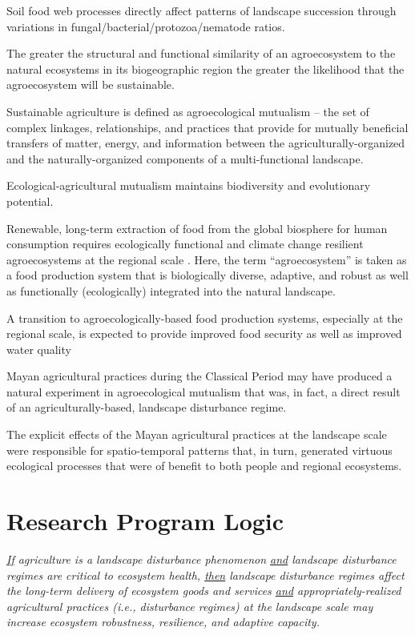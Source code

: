 \begin{outline}[enumerate]
  \1 Soil food web processes directly affect patterns of landscape succession through variations in fungal/bacterial/protozoa/nematode ratios.
  
  \1 The greater the structural and functional similarity of an agroecosystem to the natural ecosystems in its biogeographic region the greater the likelihood that the agroecosystem will be sustainable. 
  
  \1 Sustainable agriculture is defined as agroecological mutualism -- the set of complex linkages, relationships, and practices that provide for mutually beneficial transfers of matter, energy, and information between the agriculturally-organized and the naturally-organized components of a multi-functional landscape. 
  
  \1 Ecological-agricultural mutualism maintains biodiversity and evolutionary potential.
  
  \1 Renewable, long-term extraction of food from the global biosphere for human consumption requires ecologically functional and climate change resilient agroecosystems at the regional scale \citep{barnosky_approaching_2012}.  Here, the term \enquote{agroecosystem} is taken as a food production system that is biologically diverse, adaptive, and robust as well as functionally (ecologically) integrated into the natural landscape.
  
  \1 A transition to agroecologically-based food production systems, especially at the regional scale, is expected to provide improved food security as well as improved water quality \citep{godfray_food_2010, schmidhuber_global_2007} 
  
  \1 Mayan agricultural practices during the Classical Period may have produced a natural experiment in agroecological mutualism that was, in fact, a direct result of an agriculturally-based, landscape disturbance regime.
  
  \1 The explicit effects of the Mayan agricultural practices at the landscape scale were responsible for spatio-temporal patterns that, in turn, generated virtuous ecological processes that were of benefit to both people and regional ecosystems.

\end{outline}

\section{Research Program Logic}
\textit{\underline{If} agriculture is a landscape disturbance phenomenon \underline{and} landscape disturbance regimes are critical to ecosystem health, \underline{then} landscape disturbance regimes affect the long-term delivery of ecosystem goods and services \underline{and} appropriately-realized agricultural practices (i.e., disturbance regimes) at the landscape scale may increase ecosystem robustness, resilience, and adaptive capacity.}\\

